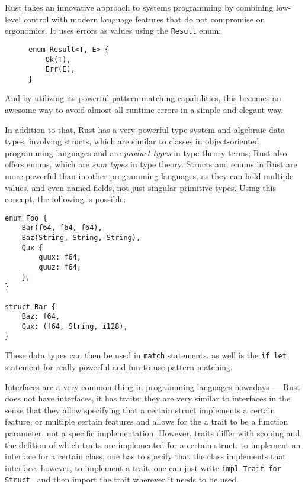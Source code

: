 Rust takes an innovative approach to systems programming by combining low-level control with modern language features
that do not compromise on ergonomics. It uses errors as values using the \texttt{Result} enum:

\begin{figure}[H]
    \begin{verbatim}
enum Result<T, E> {
    Ok(T),
    Err(E),
}
    \end{verbatim}
\end{figure}

And by utilizing its powerful pattern-matching capabilities, this becomes an awesome way to avoid almost all runtime errors
in a simple and elegant way.

In addition to that, Rust has a very powerful type system and algebraic data types, involving structs, which are similar to classes
in object-oriented programming languages and are \textit{product types} in type theory terms; Rust also offers enums, which
are \textit{sum types} in type theory. Structs and enums in Rust are more powerful than in other programming languages,
as they can hold multiple values, and even named fields, not just singular primitive types.
Using this concept, the following is possible:
\begin{verbatim}
enum Foo {
    Bar(f64, f64, f64),
    Baz(String, String, String),
    Qux {
        quux: f64,
        quuz: f64,
    },
}

struct Bar {
    Baz: f64,
    Qux: (f64, String, i128),
}
\end{verbatim}

These data types can then be used in \texttt{match} statements, as well is the \texttt{if let} statement
for really powerful and fun-to-use pattern matching.

Interfaces are a very common thing in programming languages nowadays ---
Rust does not have interfaces, it has traits: they are very similar to interfaces
in the sense that they allow specifying that a certain struct implements a certain feature,
or multiple certain features and allows for the a trait to be a function parameter,
not a specific implementation. However, traits differ with scoping and the defition of which traits are implemented for a certain struct:
to implement an interface for a certain class, one has to specify that the class implements that interface,
however, to implement a trait, one can just write \texttt{impl Trait for Struct {}} and then import the trait wherever it needs to be used.


